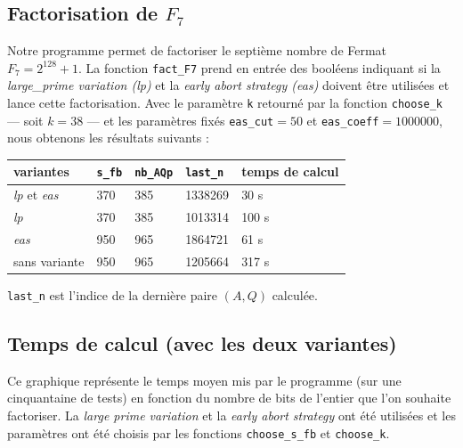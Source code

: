 \subsection{Factorisation de $F_7$}

Notre programme permet de factoriser le septième nombre de Fermat $F_7 =
2^{128} + 1$. La fonction \texttt{fact\_F7} prend en entrée des booléens
indiquant si la \textit{large\_prime variation (lp)} et la \textit{early abort
strategy (eas)} doivent être utilisées et lance cette factorisation. Avec le
paramètre \texttt{k} retourné par la fonction \texttt{choose\_k} — soit $k=38$
— et les paramètres fixés \texttt{eas\_cut}$=50$ et
\texttt{eas\_coeff}$=1000000$, nous obtenons les résultats suivants :  

\begin{center}
     \begin{tabular}{| l || l| l | l | l |}
     \hline
     variantes                    & \texttt{s\_fb} & \texttt{nb\_AQp} & \texttt{last\_n} & temps de calcul  \\ \hline
     \hline
     \textit{lp} et \textit{eas}  &     370        &  385             &    1338269       &   30 s           \\ \hline
     \textit{lp}                  &     370        &  385             &    1013314       &   100 s          \\ \hline
     \textit{eas}                 &     950        &  965             &    1864721       &   61 s           \\ \hline
     sans variante                &     950        &  965             &    1205664       &   317 s          \\ \hline
    \end{tabular}
\end{center}

\hspace*{1.6 cm} \footnotesize{\texttt{last\_n} est l'indice de la dernière
paire $(A,Q)$ calculée.}

\subsection{Temps de calcul (avec les deux variantes) }

Ce graphique représente le temps moyen mis par le programme (sur une
cinquantaine de tests) en fonction du nombre de bits de l'entier que l'on
souhaite factoriser. La \textit{large prime variation} et la \textit{early
abort strategy} ont été utilisées et les paramètres ont été choisis par les
fonctions \texttt{choose\_s\_fb} et \texttt{choose\_k}.\\

